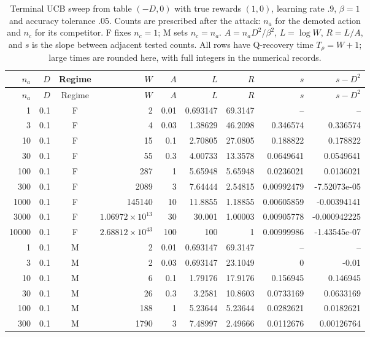 \begingroup\small\setlength{\tabcolsep}{3pt}
\begin{longtable}{rrcrrrrrr}
\caption[Complete deterministic UCB count sweep]{Terminal UCB sweep from table $(-D,0)$ with true rewards $(1,0)$, learning rate .9, $\beta=1$ and accuracy tolerance .05. Counts are prescribed after the attack: $n_a$ for the demoted action and $n_c$ for its competitor. F fixes $n_c=1$; M sets $n_c=n_a$. $A=n_aD^2/\beta^2$, $L=\log W$, $R=L/A$, and $s$ is the slope between adjacent tested counts. All rows have Q-recovery time $T_\rho=W+1$; large times are rounded here, with full integers in the numerical records.}\label{tab:complete-sweep}\\
\toprule $n_a$ & $D$ & Regime & $W$ & $A$ & $L$ & $R$ & $s$ & $s-D^2$\\\midrule\endfirsthead
\toprule $n_a$ & $D$ & Regime & $W$ & $A$ & $L$ & $R$ & $s$ & $s-D^2$\\\midrule\endhead
1 & 0.1 & F & 2 & 0.01 & 0.693147 & 69.3147 & -- & --\\
3 & 0.1 & F & 4 & 0.03 & 1.38629 & 46.2098 & 0.346574 & 0.336574\\
10 & 0.1 & F & 15 & 0.1 & 2.70805 & 27.0805 & 0.188822 & 0.178822\\
30 & 0.1 & F & 55 & 0.3 & 4.00733 & 13.3578 & 0.0649641 & 0.0549641\\
100 & 0.1 & F & 287 & 1 & 5.65948 & 5.65948 & 0.0236021 & 0.0136021\\
300 & 0.1 & F & 2089 & 3 & 7.64444 & 2.54815 & 0.00992479 & -7.52073e-05\\
1000 & 0.1 & F & 145140 & 10 & 11.8855 & 1.18855 & 0.00605859 & -0.00394141\\
3000 & 0.1 & F & $1.06972\!\times\!10^{13}$ & 30 & 30.001 & 1.00003 & 0.00905778 & -0.000942225\\
10000 & 0.1 & F & $2.68812\!\times\!10^{43}$ & 100 & 100 & 1 & 0.00999986 & -1.43545e-07\\
1 & 0.1 & M & 2 & 0.01 & 0.693147 & 69.3147 & -- & --\\
3 & 0.1 & M & 2 & 0.03 & 0.693147 & 23.1049 & 0 & -0.01\\
10 & 0.1 & M & 6 & 0.1 & 1.79176 & 17.9176 & 0.156945 & 0.146945\\
30 & 0.1 & M & 26 & 0.3 & 3.2581 & 10.8603 & 0.0733169 & 0.0633169\\
100 & 0.1 & M & 188 & 1 & 5.23644 & 5.23644 & 0.0282621 & 0.0182621\\
300 & 0.1 & M & 1790 & 3 & 7.48997 & 2.49666 & 0.0112676 & 0.00126764\\

\end{longtable}
